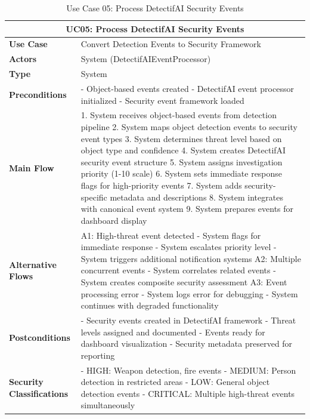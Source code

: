 \documentclass{article}
\begin{document}
\begin{table}[H]
\centering
\begin{tabularx}{\textwidth}{|l|X|}
\hline
\multicolumn{2}{|c|}{\textbf{UC05: Process DetectifAI Security Events}} \\ \hline
\textbf{Use Case} & Convert Detection Events to Security Framework \\ \hline
\textbf{Actors} & System (DetectifAIEventProcessor) \\ \hline
\textbf{Type} & System \\ \hline
\textbf{Preconditions} & 
- Object-based events created
- DetectifAI event processor initialized
- Security event framework loaded \\ \hline
\textbf{Main Flow} & 
1. System receives object-based events from detection pipeline
2. System maps object detection events to security event types
3. System determines threat level based on object type and confidence
4. System creates DetectifAI security event structure
5. System assigns investigation priority (1-10 scale)
6. System sets immediate response flags for high-priority events
7. System adds security-specific metadata and descriptions
8. System integrates with canonical event system
9. System prepares events for dashboard display \\ \hline
\textbf{Alternative Flows} & 
A1: High-threat event detected
- System flags for immediate response
- System escalates priority level
- System triggers additional notification systems
A2: Multiple concurrent events
- System correlates related events
- System creates composite security assessment
A3: Event processing error
- System logs error for debugging
- System continues with degraded functionality \\ \hline
\textbf{Postconditions} & 
- Security events created in DetectifAI framework
- Threat levels assigned and documented
- Events ready for dashboard visualization
- Security metadata preserved for reporting \\ \hline
\textbf{Security Classifications} & 
- HIGH: Weapon detection, fire events
- MEDIUM: Person detection in restricted areas
- LOW: General object detection events
- CRITICAL: Multiple high-threat events simultaneously \\ \hline
\end{tabularx}
\caption{Use Case 05: Process DetectifAI Security Events}
\end{table}
\end{document}
